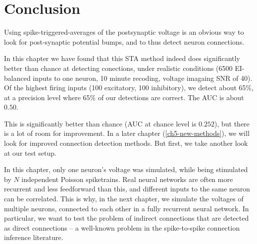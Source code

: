 \FloatBarrier
\section{Conclusion}

Using spike-triggered-averages of the postsynaptic voltage is an obvious way to look for post-synaptic potential bumps, and to thus detect neuron connections.

In this chapter we have found that this STA method indeed does significantly better than chance at detecting conections, under realistic conditions (6500 EI-balanced inputs to one neuron, 10 minute recoding, voltage imagaing SNR of 40).
Of the highest firing inputs (100 excitatory, 100 inhibitory), we detect about 65\%, at a precision level where 65\% of our detections are correct. The AUC is about $0.50$.


This is significantly better than chance (AUC at chance level is $0.252$), but there is a lot of room for improvement. In a later chapter (\cref{ch5-new-methods}), we will look for improved connection detection methods. But first, we take another look at our test setup.

In this chapter, only one neuron's voltage was simulated, while being stimulated by $N$ independent Poisson spiketrains. Real neural networks are often more recurrent and less feedforward than this, and different inputs to the same neuron can be correlated. This is why, in the next chapter, we simulate the voltages of multiple neurons, connected to each other in a fully recurrent neural network. In particular, we want to test the problem of indirect connections that are detected as direct connections -- a well-known problem in the spike-to-spike connection inference literature.\cite{Orlandi2017FirstConnectomicsChallenge,Das2020SystematicErrorsConnectivity}
